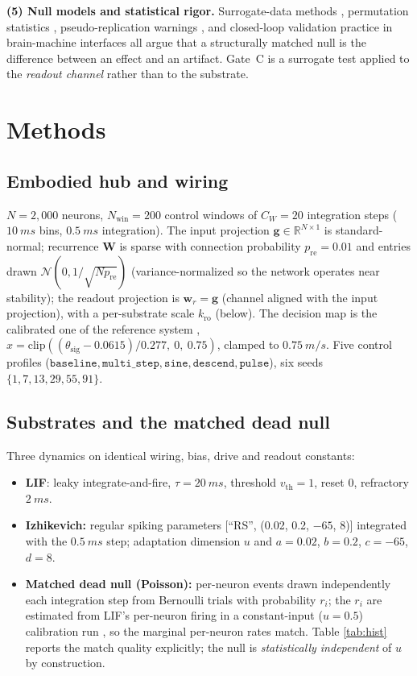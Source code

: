 \documentclass[10pt,a4paper]{article}
\begin{document}
\textbf{(5) Null models and statistical rigor.} Surrogate-data methods
\cite{theiler1992}, permutation statistics \cite{ernst2004},
pseudo-replication warnings \cite{hurlbert1984}, and closed-loop
validation practice in brain-machine interfaces
\cite{carmena2003,nicolelis2003} all argue that a structurally matched
null is the difference between an effect and an artifact. Gate~C is a
surrogate test applied to the \emph{readout channel} rather than to the
substrate.

\section{Methods}\label{sec:methods}

\subsection{Embodied hub and wiring}\label{sec:hub}

$N=2{,}000$ neurons, $N_{\mathrm{win}}=200$ control windows of
$C_W=20$ integration steps ($\SI{10}{ms}$ bins, $\SI{0.5}{ms}$
integration). The input projection
$\mathbf{g}\in\mathbb{R}^{N\times1}$ is standard-normal;
recurrence $\mathbf{W}$ is sparse with connection probability
$p_{\mathrm{re}}=0.01$ and entries drawn
$\mathcal{N}(0,1/\sqrt{N p_{\mathrm{re}}})$ (variance-normalized so the
network operates near stability); the readout projection is
$\mathbf{w}_r=\mathbf{g}$ (channel aligned with the input projection),
with a per-substrate scale $k_{\mathrm{ro}}$ (below). The decision map
is the calibrated one of the reference system
\cite{embodied_neurocomp},
$\hat{x}=\mathrm{clip}((\theta_{\mathrm{sig}}-0.0615)/0.277,\ 0,\ 0.75)$,
clamped to $\SI{0.75}{m/s}$. Five control profiles
($\mathtt{baseline},\mathtt{multi\_step},\mathtt{sine},\mathtt{descend},
\mathtt{pulse}$), six seeds $\{1,7,13,29,55,91\}$.

\subsection{Substrates and the matched dead null}\label{sec:subs}

Three dynamics on identical wiring, bias, drive and readout constants:

\begin{itemize}[nosep]
\item \textbf{LIF}: leaky integrate-and-fire, $\tau=\SI{20}{ms}$,
threshold $v_{\mathrm{th}}=1$, reset $0$, refractory $\SI{2}{ms}$.
\item \textbf{Izhikevich:} regular spiking parameters [``RS'', (0.02,
0.2, $-65$, $8$)] integrated with the $\SI{0.5}{ms}$ step; adaptation
dimension $u$ and $a=0.02$, $b=0.2$, $c=-65$, $d=8$.
\item \textbf{Matched dead null (Poisson):} per-neuron events drawn
independently each integration step from Bernoulli trials with
probability $r_i$; the $r_i$ are estimated from LIF's per-neuron
firing in a constant-input ($u=0.5$) calibration run
\cite{theiler1992}, so the marginal per-neuron rates match. Table
\ref{tab:hist} reports the match quality explicitly; the null is
\emph{statistically independent} of $u$ by construction.
\end{itemize}
\end{document}
